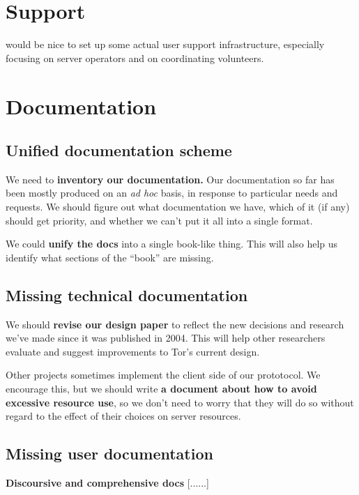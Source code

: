 \documentclass{article}
\newcommand{\tmp}[1]{{\bf #1} [......] \\}
\begin{document}
\section{Support}

would be nice to set up some actual user support infrastructure, especially
focusing on server operators and on coordinating volunteers.



\section{Documentation}

\subsection{Unified documentation scheme}

We need to {\bf inventory our documentation.}  Our documentation so far has
been mostly produced on an {\it ad hoc} basis, in response to particular
needs and requests.  We should figure out what documentation we have, which of
it (if any) should get priority, and whether we can't put it all into a
single format.

We could {\bf unify the docs} into a single book-like thing.  This will also
help us identify what sections of the ``book'' are missing.

\subsection{Missing technical documentation}

We should {\bf revise our design paper} to reflect the new decisions and
research we've made since it was published in 2004.  This will help other
researchers evaluate and suggest improvements to Tor's current design.

Other projects sometimes implement the client side of our prototocol.  We
encourage this, but we should write {\bf a document about how to avoid
excessive resource use}, so we don't need to worry that they will do so
without regard to the effect of their choices on server resources.

\subsection{Missing user documentation}

\tmp{Discoursive and comprehensive docs}

 
\end{document}
